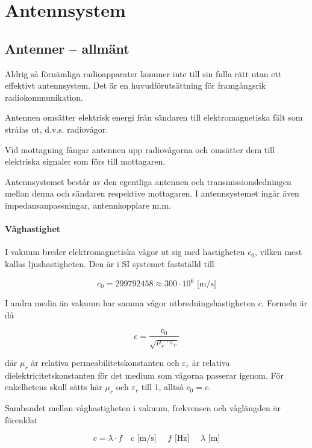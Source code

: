 \chapter{Antennsystem}

\section{Antenner -- allmänt}

Aldrig så förnämliga radioapparater kommer inte till sin fulla rätt utan ett
effektivt antennsystem.
Det är en huvudförutsättning för framgångsrik radiokommunikation.

Antennen omsätter elektrisk energi från sändaren till elektromagnetiska fält
som strålas ut, d.v.s. radiovågor.

Vid mottagning fångar antennen upp radiovågorna och omsätter dem till
elektriska signaler som förs till mottagaren.

Antennsystemet består av den egentliga antennen och transmissionsledningen
mellan denna och sändaren respektive mottagaren.
I antennsystemet ingår även impedansanpassningar, antennkopplare m.m.

\subsubsection{Våghastighet}
\label{ljushastigheten}

I vakuum breder elektromagnetiska vågor ut sig med hastigheten \(c_0\), vilken
mest kallas ljushastigheten.
Den är i SI systemet \cite{SIbrochure8} fastställd till

\[c_0 = 299 792 458 \approx 300 \cdot 10^6 \text{ [m/s]}\]

I andra media än vakuum har samma vågor utbredningshastigheten \(c\).
Formeln är då

\[c = \frac{c_0}{\sqrt{\mu_r \cdot \varepsilon_r}}\]

där \(\mu_r\) är relativa permeabilitetskonstanten och \(\varepsilon_r\) är
relativa dielektricitetskonstanten för det medium som vågorna passerar igenom.
För enkelhetens skull sätts här \(\mu_r\) och \(\varepsilon_r\) till 1,
alltså \(c_0 = c\).

Sambandet mellan våghastigheten i vakuum, frekvensen och våglängden är förenklat

\[ c = \lambda \cdot f \quad c\text{ [m/s] }\quad f\text{ [Hz] } \quad \lambda\text{ [m]}\]

